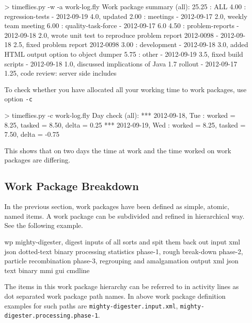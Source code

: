 \documentclass[11pt]{article}
\begin{document}
\begin{inputfile}
> timeflies.py -w -a work-log.fly 
Work package summary (all):
 25.25 : ALL
      4.00 : regression-tests
             - 2012-09-19 4.0, updated
      2.00 : meetings
             - 2012-09-17 2.0, weekly team meeting
      6.00 : quality-task-force
             - 2012-09-17 6.0
      4.50 : problem-reports
             - 2012-09-18 2.0, wrote unit test to reproduce problem report 2012-0098
             - 2012-09-18 2.5, fixed problem report 2012-0098
      3.00 : development
             - 2012-09-18 3.0, added HTML output option to object dumper
      5.75 : other
             - 2012-09-19 3.5, fixed build scripts
             - 2012-09-18 1.0, discussed implications of Java 1.7 rollout
             - 2012-09-17 1.25, code review: server side includes
\end{inputfile}

To check whether you have allocated all your working time to work packages, use option \verb:-c:

\begin{inputfile}
> timeflies.py -c work-log.fly 
Day check (all):
*** 2012-09-18, Tue : worked =  8.25, tasked =  8.50, delta =  0.25
*** 2012-09-19, Wed : worked =  8.25, tasked =  7.50, delta = -0.75
\end{inputfile}

This shows that on two days the time at work and the time worked on work packages are differing.

\subsection{Work Package Breakdown}

In the previous section, work packages have been defined as simple, atomic, named items. A work package can be subdivided and refined in hierarchical way. See the following example.

\begin{inputfile}
wp mighty-digester, digest inputs of all sorts and spit them back out
    input
        xml
        json
        dotted-text
        binary
    processing
        statistics
        phase-1, rough break-down
        phase-2, particle recombination
        phase-3, regrouping and amalgamation
    output
        xml
        json
        text
        binary
    mmi
        gui
        cmdline
\end{inputfile}

The items in this work package hierarchy can be referred to in activity lines as dot separated work package path names. In above work package definition examples for such paths are \verb:mighty-digester.input.xml:, \verb:mighty-digester.processing.phase-1:.
\end{document}
